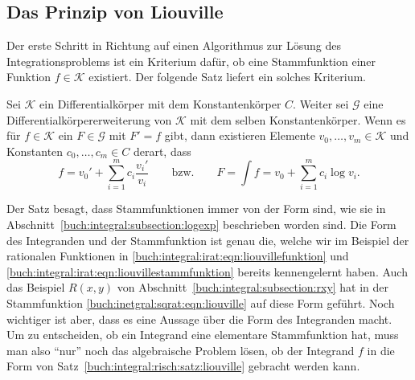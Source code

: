 %
%
%
\subsection{Das Prinzip von Liouville
\label{buch:integral:risch:subsection:liouville}}
Der erste Schritt in Richtung auf einen Algorithmus zur Lösung des
Integrationsproblems ist ein Kriterium dafür, ob eine Stammfunktion
einer Funktion $f\in\mathscr{K}$ existiert.
Der folgende Satz liefert ein solches Kriterium.

\begin{satz}
\label{buch:integral:risch:satz:liouville}
%
Sei $\mathscr{K}$ ein Differentialkörper mit dem Konstantenkörper $C$.
Weiter sei $\mathscr{G}$ eine Differentialkörpererweiterung von $\mathscr{K}$
mit dem selben Konstantenkörper.
Wenn es für $f\in\mathscr{K}$ ein $F\in\mathscr{G}$ mit $F'=f$ gibt,
dann existieren Elemente $v_0,\dots,v_m\in\mathscr{K}$ und
Konstanten $c_0,\dots,c_m\in C$ derart, dass
\[
f = v_0' + \sum_{i=1}^m c_i\frac{v_i'}{v_i}
\qquad\text{bzw.}\qquad
F
=
\int f
=
v_0 + \sum_{i=1}^m c_i \log v_i.
\]
\end{satz}

Der Satz besagt, dass Stammfunktionen immer von der Form sind, wie sie in
Abschnitt~\ref{buch:integral:subsection:logexp} beschrieben worden sind.
Die Form des Integranden und der Stammfunktion ist genau die, 
welche wir im Beispiel der rationalen Funktionen in
\eqref{buch:integral:irat:eqn:liouvillefunktion}
und
\eqref{buch:integral:irat:eqn:liouvillestammfunktion}
bereits kennengelernt haben.
Auch das Beispiel $R(x,y)$ von Abschnitt~\ref{buch:integral:subsection:rxy}
hat in der Stammfunktion \eqref{buch:inetgral:sqrat:eqn:liouville}
auf diese Form geführt.
Noch wichtiger ist aber, dass es eine Aussage über die Form des
Integranden macht.
Um zu entscheiden, ob ein Integrand eine elementare Stammfunktion
hat, muss man also  ``nur'' noch das algebraische Problem lösen,
ob der Integrand $f$ in die Form von
Satz~\ref{buch:integral:risch:satz:liouville}
gebracht werden kann.

